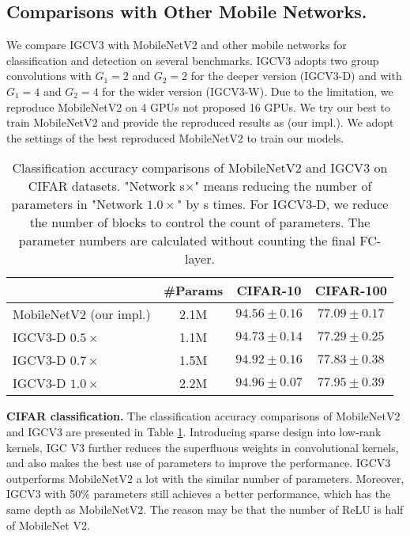 \documentclass{bmvc2k}
\begin{document}
	\subsection{Comparisons with Other Mobile Networks.}
	We compare IGCV$3$ with MobileNetV$2$ and other mobile networks for classification and detection on several benchmarks. IGCV$3$ adopts two group convolutions with $G_1=2$ and $G_2=2$ for the deeper version (IGCV$3$-D) and with $G_1=4$ and $G_2=4$ for the wider version (IGCV$3$-W). Due to the limitation, we reproduce MobileNetV$2$ on 4 GPUs not proposed 16 GPUs. We try our best to train MobileNetV$2$ and provide the reproduced results as (our impl.). We adopt the settings of the best reproduced MobileNetV$2$ to train our models.
	\begin{table}[htb!]
		\centering
		\begin{tabular}{|l||c|c|c|}
			\hline
			& \#Params& CIFAR-10 & CIFAR-100\\
			\hline\hline
			MobileNetV$2$ (our impl.) & 2.1M & $94.56\pm{0.16}$ & $77.09\pm{0.17}$\\
			IGCV$3$-D $0.5\times$ & 1.1M & $94.73\pm0.14$  & $77.29\pm0.25$ \\
			IGCV$3$-D $0.7\times$ & 1.5M & $94.92\pm0.16$ & $77.83\pm0.38$ \\
			IGCV$3$-D $1.0\times$ & 2.2M & $\mathbf{94.96\pm{0.07}}$ &$\mathbf{77.95\pm0.39}$ \\
			\hline
		\end{tabular}
		\caption{Classification accuracy comparisons of MobileNetV$2$ and IGCV$3$ on CIFAR datasets. "Network s$\times$" means reducing the number of parameters in "Network $1.0\times$" by s times. For IGCV$3$-D, we reduce the number of blocks to control the count of parameters. The parameter numbers are calculated without counting the final FC-layer.}
		\label{tab:diff_mn_igcv3}
	\end{table}

	\noindent\textbf{CIFAR classification.} The classification accuracy comparisons of MobileNetV$2$ and IGCV$3$ are presented in Table \ref{tab:diff_mn_igcv3}. Introducing sparse design into low-rank kernels, IGC V3 further reduces the superfluous weights in convolutional kernels, and also makes the best use of parameters to improve the performance. IGCV$3$ outperforms MobileNetV$2$ a lot with the similar number of parameters. Moreover, IGCV$3$ with 50\% parameters still achieves a better performance, which has the same depth as MobileNetV2. The reason may be that the number of ReLU is half of MobileNet V2.
\end{document}

